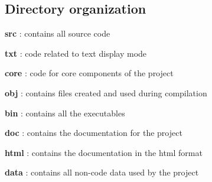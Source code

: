 \subsection*{Directory organization}


\begin{DoxyItemize}
\item {\bfseries src} \+: contains all source code
\begin{DoxyItemize}
\item {\bfseries txt} \+: code related to text display mode
\item {\bfseries core} \+: code for core components of the project
\end{DoxyItemize}
\item {\bfseries obj} \+: contains files created and used during compilation
\item {\bfseries bin} \+: contains all the executables
\item {\bfseries doc} \+: contains the documentation for the project
\begin{DoxyItemize}
\item {\bfseries html} \+: contains the documentation in the html format
\end{DoxyItemize}
\item {\bfseries data} \+: contains all non-\/code data used by the project 
\end{DoxyItemize}